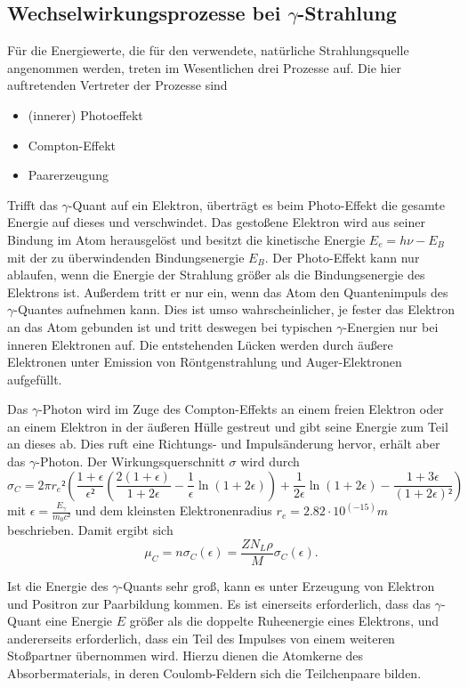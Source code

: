 \subsection{Wechselwirkungsprozesse bei \texorpdfstring{$\gamma$}{Gamma}-Strahlung}
Für die Energiewerte, die für den verwendete, natürliche Strahlungsquelle angenommen werden, treten im Wesentlichen drei Prozesse auf.
Die hier auftretenden Vertreter der Prozesse sind 
\begin{itemize}
	\item{(innerer) Photoeffekt}
	\item{Compton-Effekt}
	\item{Paarerzeugung}
\end{itemize}
Trifft das $\gamma$-Quant auf ein Elektron, überträgt es beim Photo-Effekt die gesamte Energie auf dieses und verschwindet. 
Das gestoßene Elektron wird aus seiner Bindung im Atom herausgelöst und besitzt die kinetische Energie $E_e=h\nu-E_B$ mit der zu überwindenden Bindungsenergie $E_B$. 
Der Photo-Effekt kann nur ablaufen, wenn die Energie der Strahlung größer als die Bindungsenergie des Elektrons ist. 
Außerdem tritt er nur ein, wenn das Atom den Quantenimpuls des $\gamma$-Quantes aufnehmen kann. 
Dies ist umso wahrscheinlicher, je fester das Elektron an das Atom gebunden ist und tritt deswegen bei typischen $\gamma$-Energien nur bei inneren Elektronen auf. 
Die entstehenden Lücken werden durch äußere Elektronen unter Emission von Röntgenstrahlung und Auger-Elektronen aufgefüllt.

Das $\gamma$-Photon wird im Zuge des Compton-Effekts an einem freien Elektron oder an einem Elektron in der äußeren Hülle gestreut und gibt seine Energie zum Teil an dieses ab. 
Dies ruft eine Richtungs- und Impulsänderung hervor, erhält aber das $\gamma$-Photon.
Der Wirkungsquerschnitt $\sigma$ wird durch
\begin{equation}
	\sigma_C=2\pi  r_e²\left(\frac{1+\epsilon}{\epsilon²}\left(\frac{2(1+\epsilon)}{1+2\epsilon}-\frac{1}{\epsilon}\ln(1+2\epsilon)\right)+\frac{1}{2\epsilon}\ln(1+2\epsilon)-\frac{1+3\epsilon}{(1+2\epsilon)²}\right)
\end{equation}
mit $\epsilon=\frac{E_{\gamma}}{m_0c²}$ und dem kleinsten Elektronenradius $r_e=2.82\cdot 10^(-15)m$ beschrieben. 
Damit ergibt sich
\begin{equation}
	\mu_C=n\sigma_C(\epsilon)=\frac{Z N_L \rho}{M}\sigma_C(\epsilon).
\end{equation}

Ist die Energie des $\gamma$-Quants sehr groß, kann es unter Erzeugung von Elektron und Positron zur Paarbildung kommen.
Es ist einerseits erforderlich, dass das $\gamma$-Quant eine Energie $E$ größer als die doppelte Ruheenergie eines Elektrons, und andererseits erforderlich, dass ein Teil des Impulses von einem weiteren Stoßpartner übernommen wird.
Hierzu dienen die Atomkerne des Absorbermaterials, in  deren Coulomb-Feldern  sich die  Teilchenpaare bilden.

